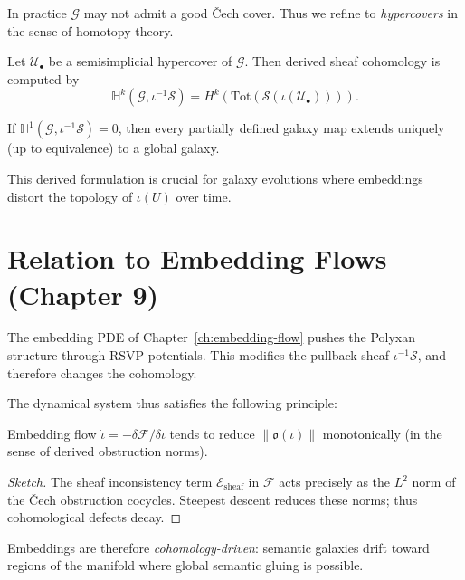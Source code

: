 In practice $\mathcal{G}$ may not admit a good Čech cover.
Thus we refine to \emph{hypercovers} in the sense of homotopy theory.

Let $\mathcal{U}_\bullet$ be a semisimplicial hypercover of $\mathcal{G}$.
Then derived sheaf cohomology is computed by
\[
  \mathbb{H}^k(\mathcal{G},\iota^{-1}\mathscr{S})
  =
  H^k(\mathrm{Tot}(\mathscr{S}(\iota(\mathcal{U}_\bullet)))).
\]

\begin{theorem}
If $\mathbb{H}^1(\mathcal{G},\iota^{-1}\mathscr{S})=0$,  
then every partially defined galaxy map extends uniquely (up to equivalence) to a global galaxy.
\end{theorem}

This derived formulation is crucial for galaxy evolutions 
where embeddings distort the topology of $\iota(U)$ over time.

\section{Relation to Embedding Flows (Chapter 9)}

The embedding PDE of Chapter~\ref{ch:embedding-flow} 
pushes the Polyxan structure through RSVP potentials.
This modifies the pullback sheaf
\(
  \iota^{-1}\mathscr{S}
\),
and therefore changes the cohomology.

The dynamical system thus satisfies the following principle:

\begin{theorem}
Embedding flow $\dot\iota=-\delta\mathcal{F}/\delta\iota$  
tends to reduce 
\(
  \|\mathfrak{o}(\iota)\|
\)
monotonically (in the sense of derived obstruction norms).
\end{theorem}

\begin{proof}[Sketch]
The sheaf inconsistency term $\mathcal{E}_{\mathrm{sheaf}}$ in $\mathcal{F}$
acts precisely as the $L^2$ norm of the Čech obstruction cocycles.  
Steepest descent reduces these norms; thus cohomological defects decay.
\end{proof}

Embeddings are therefore \emph{cohomology-driven}:
semantic galaxies drift toward regions of the manifold
where global semantic gluing is possible.


